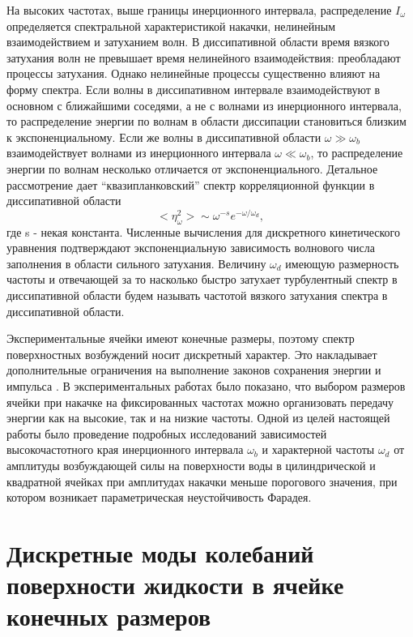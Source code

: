 На высоких частотах, выше границы инерционного интервала, распределение $I_\omega$ определяется спектральной характеристикой накачки, нелинейным взаимодействием и затуханием волн. В диссипативной области время вязкого затухания волн не превышает время нелинейного взаимодействия: преобладают процессы затухания. Однако нелинейные процессы существенно влияют на форму спектра. Если волны в диссипативном интервале взаимодействуют в основном с ближайшими соседями, а не с волнами из инерционного интервала, то распределение энергии по волнам в области диссипации становиться близким к экспоненциальному.
Если же волны в диссипативной области $\omega \gg \omega_b$ взаимодействует волнами из инерционного интервала $\omega \ll \omega_b$, то распределение энергии по волнам несколько отличается от экспоненциального. Детальное рассмотрение дает “квазипланковский” спектр корреляционной функции в диссипативной области \cite{Ryzhenkova1990}
\begin{equation}
<\eta_\omega^2> \sim \omega^{-s} e^{-\omega/\omega_d},
\end{equation}			
где s - некая константа. Численные вычисления для дискретного кинетического уравнения \cite{Ryzhenkova1990} подтверждают экспоненциальную зависимость волнового числа заполнения в области сильного затухания. Величину $\omega_d$ имеющую размерность частоты и отвечающей за то насколько быстро затухает турбулентный спектр в диссипативной области будем называть частотой вязкого затухания спектра в диссипативной области.
	
Экспериментальные ячейки имеют конечные размеры, поэтому спектр поверхностных возбуждений носит дискретный характер. Это накладывает дополнительные ограничения на выполнение законов сохранения энергии и импульса \cite{Kartashova1991}. В экспериментальных работах \cite{Brazhnikov2014, Aburakhimov2015} было показано, что выбором размеров ячейки при накачке на фиксированных частотах можно организовать передачу энергии как на высокие, так и на низкие частоты.
Одной из целей настоящей работы было проведение подробных исследований зависимостей высокочастотного края инерционного интервала $\omega_b$ и характерной частоты $\omega_d$ от амплитуды возбуждающей силы на поверхности воды в цилиндрической и квадратной ячейках при амплитудах накачки меньше порогового значения, при котором возникает параметрическая неустойчивость Фарадея.

\section{Дискретные моды колебаний поверхности жидкости в ячейке конечных размеров} %

